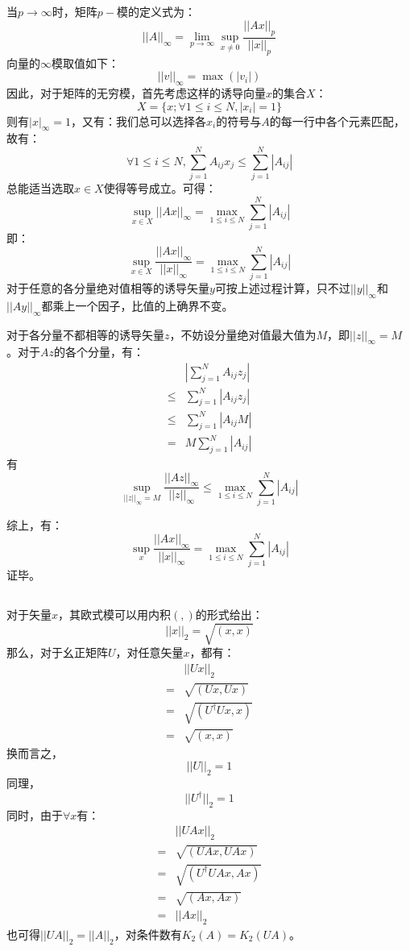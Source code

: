 \documentclass{ctexart}
\begin{document}
    \subsection{}
    当$p\to\infty$时，矩阵$p-$模的定义式为：
    $$||A||_{\infty}=\lim_{p\to\infty}{\sup_{x\neq0}{\frac{||Ax||_p}{||x||_p}}}$$
    向量的$\infty$模取值如下：
    $$||v||_{\infty}=\max{(|v_i|)}$$
    因此，对于矩阵的无穷模，首先考虑这样的诱导向量$x$的集合$X$：
    $$X=\{x;\forall 1\leq i \leq N,|x_i|=1\}$$
    则有$|x|_{\infty}=1$，又有：我们总可以选择各$x_i$的符号与$A$的每一行中各个元素匹配，故有：
    $$\forall 1\leq i \leq N,\sum_{j=1}^{N}{A_{ij}x_j}\leq\sum_{j=1}^{N}{|A_{ij}|}$$
    总能适当选取$x\in X$使得等号成立。可得：
    $$\sup_{x\in X}{||Ax||_{\infty}}=\max_{1\leq i \leq N}{\sum_{j=1}^{N}{|A_{ij}|}}$$
    即：
    $$\sup_{x\in X}\frac{||Ax||_{\infty}}{||x||_\infty}=\max_{1\leq i \leq N}{\sum_{j=1}^{N}{|A_{ij}|}}$$
    对于任意的各分量绝对值相等的诱导矢量$y$可按上述过程计算，只不过$||y||_\infty$和$||Ay||_\infty$都乘上一个因子，比值的上确界不变。
    
    \par
    对于各分量不都相等的诱导矢量$z$，不妨设分量绝对值最大值为$M$，即$||z||_\infty=M$。对于$Az$的各个分量，有：
    \begin{align*}
    &|\sum_{j=1}^{N}{A_{ij}{z_j}}|\\
    \leq&\sum_{j=1}^{N}{|A_{ij}{z_j}|}\\
    \leq&\sum_{j=1}^{N}{|A_{ij}M|}\\
    =&M\sum_{j=1}^N{|A_{ij}|}
    \end{align*}
    有
    $$\sup_{||z||_\infty=M}\frac{||Az||_{\infty}}{||z||_\infty}\leq\max_{1\leq i \leq N}{\sum_{j=1}^{N}{|A_{ij}|}}$$
    \par
    综上，有：
    $$\sup_{x}\frac{||Ax||_{\infty}}{||x||_\infty}=\max_{1\leq i \leq N}{\sum_{j=1}^{N}{|A_{ij}|}}$$
    证毕。
    \subsection{}
    对于矢量$x$，其欧式模可以用内积$(,)$的形式给出：
    $$||x||_2=\sqrt{(x,x)}$$
    那么，对于幺正矩阵$U$，对任意矢量$x$，都有：
    \begin{align*}
        &||Ux||_2\\
        =&\sqrt{(Ux,Ux)}\\
        =&\sqrt{(U^{\dagger}Ux,x)}\\
        =&\sqrt{(x,x)}
    \end{align*}
    换而言之，$$||U||_2=1$$同理，$$||U^{\dagger}||_2=1$$
    同时，由于$\forall x$有：
    \begin{align*}
        &||UAx||_2\\
        =&\sqrt{(UAx,UAx)}\\
        =&\sqrt{(U^{\dagger}UAx,Ax)}\\
        =&\sqrt{(Ax,Ax)}\\
        =&||Ax||_2
    \end{align*}
    也可得$||UA||_2=||A||_2$，对条件数有$K_2(A)=K_2(UA)$。
\end{document}

